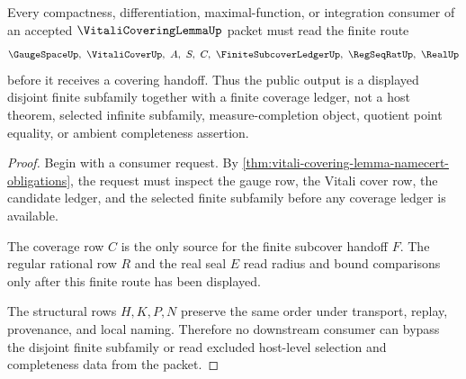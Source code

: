 \begin{theorem}
\label{thm:vitali-covering-lemma-finite-disjoint-handoff}
Every compactness, differentiation, maximal-function, or integration consumer of an accepted $\VitaliCoveringLemmaUp$ packet must read the finite route
$$
\GaugeSpaceUp,\ \VitaliCoverUp,\ A,\ S,\ C,\ \FiniteSubcoverLedgerUp,\ \RegSeqRatUp,\ \RealUp
$$
before it receives a covering handoff. Thus the public output is a displayed disjoint finite subfamily together with a finite coverage ledger, not a host theorem, selected infinite subfamily, measure-completion object, quotient point equality, or ambient completeness assertion.
\end{theorem}
\begin{proof}
Begin with a consumer request. By \autoref{thm:vitali-covering-lemma-namecert-obligations}, the request must inspect the gauge row, the Vitali cover row, the candidate ledger, and the selected finite subfamily before any coverage ledger is available.

The coverage row $C$ is the only source for the finite subcover handoff $F$. The regular rational row $R$ and the real seal $E$ read radius and bound comparisons only after this finite route has been displayed.

The structural rows $H,K,P,N$ preserve the same order under transport, replay, provenance, and local naming. Therefore no downstream consumer can bypass the disjoint finite subfamily or read excluded host-level selection and completeness data from the packet.
\end{proof}




